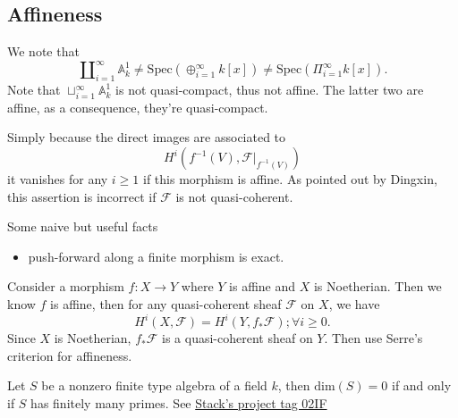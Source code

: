 \documentclass[../main.tex]{subfiles}
\begin{document}
\subsection{Affineness}
\begin{example}
We note that $$\amalg_{i=1}^{\infty} \mathbb{A}_{k}^{1}\neq \mathrm{Spec}(\oplus_{i=1}^{\infty}k[x])\neq \mathrm{Spec}(\Pi_{i=1}^{\infty}k[x]).$$
Note that $\sqcup_{i=1}^{\infty} \mathbb{A}_{k}^{1}$ is not quasi-compact, thus not affine. The latter two are affine, as a consequence, they're quasi-compact.
\end{example}
\begin{example}
Simply because the direct images are associated to 
$$H^{i}(f^{-1}(V),\mathscr{F}|_{f^{-1}(V)})$$
it vanishes for any $i\geq 1$ if this morphism is affine. As pointed out by Dingxin, this assertion is incorrect if $\mathscr{F}$ is not quasi-coherent. 
\end{example}
\begin{remark}
Some naive but useful facts
\begin{itemize}
    \item push-forward along a finite morphism is exact.
\end{itemize}
\end{remark}


\begin{example}
Consider a morphism $f:X\rightarrow Y$ where $Y$ is affine and $X$ is Noetherian. Then we know $f$ is affine, then for any quasi-coherent sheaf $\mathscr{F}$ on $X$, we have 
$$H^{i}(X,\mathscr{F})=H^{i}(Y, f_{*}\mathscr{F});\forall i\geq 0.$$
Since $X$ is Noetherian, $f_{*}\mathscr{F}$ is a quasi-coherent sheaf on $Y$. Then use Serre's criterion for affineness.
\end{example}
\begin{example}
\end{example}
\begin{remark}
Let $S$ be a nonzero finite type algebra of a field $k$, then $\mathrm{dim}(S)=0$ if and only if $S$ has finitely many primes. See
\href{http://stacks.math.columbia.edu/tag/02IF}{Stack's project tag 02IF}
\end{remark}
\end{document}
